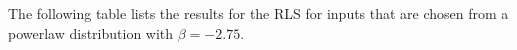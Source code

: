 The following table lists the results for the RLS for inputs that are chosen from a powerlaw distribution with $\beta=-2.75$.
